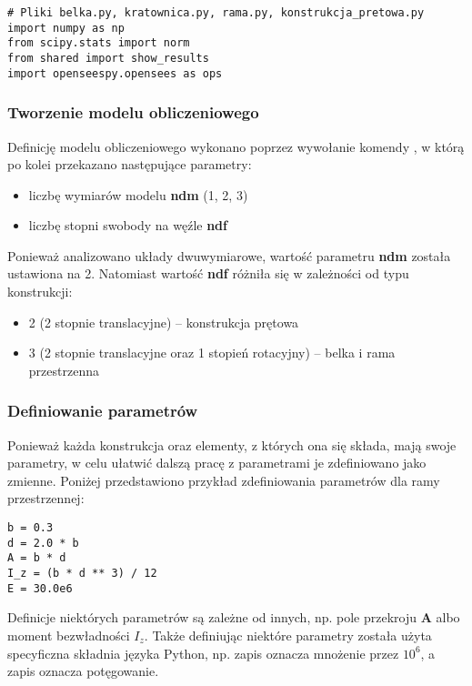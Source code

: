 \begin{lstlisting}
# Pliki belka.py, kratownica.py, rama.py, konstrukcja_pretowa.py
import numpy as np
from scipy.stats import norm
from shared import show_results
import openseespy.opensees as ops
\end{lstlisting}

\subsubsection{Tworzenie modelu obliczeniowego}

Definicję modelu obliczeniowego wykonano poprzez wywołanie komendy
, w którą po kolei przekazano następujące parametry:

\begin{itemize}
    \item liczbę wymiarów modelu \textbf{ndm} (1, 2, 3)
    \item liczbę stopni swobody na węźle \textbf{ndf}
\end{itemize}

Ponieważ analizowano układy dwuwymiarowe, wartość parametru \textbf{ndm} została ustawiona na 2.
Natomiast wartość \textbf{ndf} różniła się w zależności od typu konstrukcji:

\begin{itemize}
    \item 2 (2 stopnie translacyjne) – konstrukcja prętowa
    \item 3 (2 stopnie translacyjne oraz 1 stopień rotacyjny) – belka i rama przestrzenna
\end{itemize}

\subsubsection{Definiowanie parametrów}

Ponieważ każda konstrukcja oraz elementy, z których ona się składa, mają swoje parametry, w celu ułatwić dalszą pracę z parametrami
je zdefiniowano jako zmienne.
Poniżej przedstawiono przykład zdefiniowania parametrów dla ramy przestrzennej:

\begin{lstlisting}
b = 0.3
d = 2.0 * b
A = b * d
I_z = (b * d ** 3) / 12
E = 30.0e6
\end{lstlisting}

Definicje niektórych parametrów są zależne od innych, np. pole przekroju \textbf{A} albo moment bezwładności \textbf{$I_z$}.
Także definiując niektóre parametry została użyta specyficzna składnia języka Python, np. zapis  oznacza mnożenie
przez \textbf{$10^6$}, a zapis \ilc{**} oznacza potęgowanie.

